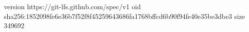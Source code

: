 version https://git-lfs.github.com/spec/v1
oid sha256:1852098fe6e36b7f52f8f45259643686fa1768bffcd6b90f94fe40e35be3dbe3
size 349692
